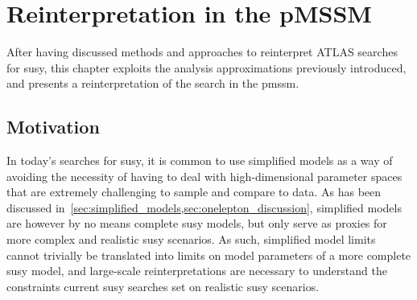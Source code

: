 


\chapter{Reinterpretation in the pMSSM}\label{ch:pmssm}

\graphicspath{{chapter-pmssm/Figs/Vector/}{chapter-pmssm/Figs/}}

After having discussed methods and approaches to reinterpret ATLAS searches for \gls{susy}, this chapter exploits the analysis approximations previously introduced, and presents a reinterpretation of the \onelepton search in the \gls{pmssm}.

\section{Motivation}

In today's searches for \gls{susy}, it is common to use simplified models as a way of avoiding the necessity of having to deal with high-dimensional parameter spaces that are extremely challenging to sample and compare to data.
As has been discussed in~\cref{sec:simplified_models,sec:onelepton_discussion}, simplified models are however by no means complete \gls{susy} models, but only serve as proxies for more complex and realistic \gls{susy} scenarios. As such, simplified model limits cannot trivially be translated into limits on model parameters of a more complete \gls{susy} model, and large-scale reinterpretations are necessary to understand the constraints current \gls{susy} searches set on realistic \gls{susy} scenarios. 

